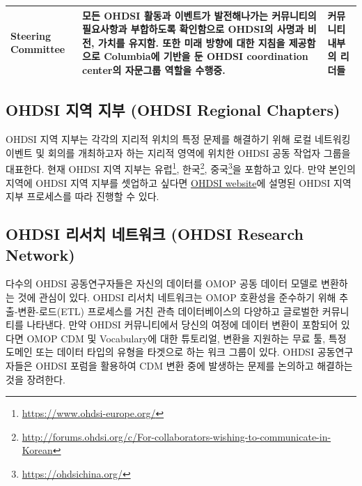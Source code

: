 \documentclass[11pt]{book}
\let\rmarkdownfootnote\footnote%
\def\footnote{\protect\rmarkdownfootnote}
\theoremstyle{definition}
\theoremstyle{definition}
\theoremstyle{definition}
\theoremstyle{remark}
\begin{document}
\begin{longtable}[]{@{}lll@{}}
\begin{minipage}[t]{0.11\columnwidth}\raggedright\strut
Steering Committee\strut
\end{minipage} & \begin{minipage}[t]{0.30\columnwidth}\raggedright\strut
모든 OHDSI 활동과 이벤트가 발전해나가는 커뮤니티의 필요사항과 부합하도록
확인함으로 OHDSI의 사명과 비전, 가치를 유지함. 또한 미래 방향에 대한
지침을 제공함으로 Columbia에 기반을 둔 OHDSI coordination center의
자문그룹 역할을 수행중.\strut
\end{minipage} & \begin{minipage}[t]{0.15\columnwidth}\raggedright\strut
커뮤니티 내부의 리더들\strut
\end{minipage}\tabularnewline
\bottomrule
\end{longtable}

\subsection{OHDSI 지역 지부 (OHDSI Regional
Chapters)}\label{ohdsi---ohdsi-regional-chapters}

OHDSI 지역 지부는 각각의 지리적 위치의 특정 문제를 해결하기 위해 로컬
네트워킹 이벤트 및 회의를 개최하고자 하는 지리적 영역에 위치한 OHDSI
공동 작업자 그룹을 대표한다. 현재 OHDSI 지역 지부는 유럽\footnote{\url{https://www.ohdsi-europe.org/}},
한국\footnote{\url{http://forums.ohdsi.org/c/For-collaborators-wishing-to-communicate-in-Korean}},
중국\footnote{\url{https://ohdsichina.org/}}을 포함하고 있다. 만약
본인의 지역에 OHDSI 지역 지부를 셋업하고 싶다면
\href{https://www.ohdsi.org/who-we-are/regional-chapters}{OHDSI
website}에 설명된 OHDSI 지역 지부 프로세스를 따라 진행할 수 있다.

\subsection{OHDSI 리서치 네트워크 (OHDSI Research
Network)}\label{ohdsi---ohdsi-research-network}

다수의 OHDSI 공동연구자들은 자신의 데이터를 OMOP 공동 데이터 모델로
변환하는 것에 관심이 있다. OHDSI 리서치 네트워크는 OMOP 호환성을
준수하기 위해 추출-변환-로드(ETL) 프로세스를 거친 관측 데이터베이스의
다양하고 글로벌한 커뮤니티를 나타낸다. 만약 OHDSI 커뮤니티에서 당신의
여정에 데이터 변환이 포함되어 있다면 OMOP CDM 및 Vocabulary에 대한
튜토리얼, 변환을 지원하는 무료 툴, 특정 도메인 또는 데이터 타입의 유형을
타겟으로 하는 워크 그룹이 있다. OHDSI 공동연구자들은 OHDSI 포럼을
활용하여 CDM 변환 중에 발생하는 문제를 논의하고 해결하는 것을 장려한다.
\end{document}
